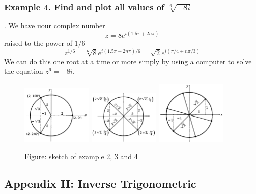 \documentclass[../main.tex]{subfiles}
\begin{document}
\subsubsection*{Example 4. Find and plot all values of $\sqrt[6]{-8i}$}. We have uour complex number
\begin{equation*}
    z=8e^{i(1.5\pi+2n\pi)}
\end{equation*}
raised to the power of $1/6$
\begin{equation*}
    z^{1/6}=\sqrt[6]{8} e^{i(1.5\pi+2n\pi)/6}=\sqrt{2}e^{i(\pi/4+n\pi/3)}
\end{equation*}
We can do this one root at a time or more simply by using a computer to solve the equation $z^6 = -8i$.
\begin{figure}[h]
    \centering
    \includegraphics[width=0.3\textwidth]{../Rss/Com/AppendEx1.2.png}
    \includegraphics[width=0.3\textwidth]{../Rss/Com/AppendEx1.3.png}
    \includegraphics[width=0.3\textwidth]{../Rss/Com/AppendEx1.4.png}
    \caption*{Figure: sketch of example 2, 3 and 4}
\end{figure} 

\subsection*{Appendix II: Inverse Trigonometric} 
\end{document}
